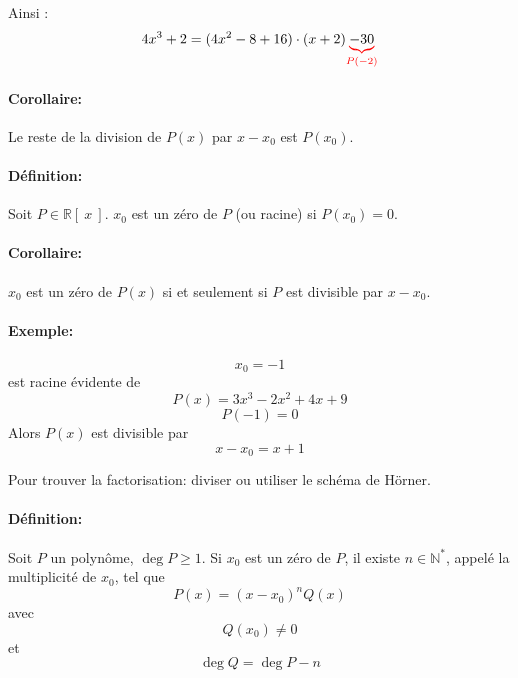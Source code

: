 \documentclass[
    11pt,
    a4paper,
    oneside,
    headinlcude, footinclude,
    twoside,
]{report}
\begin{document}
Ainsi : 
$$4x^{3} + 2 = (4x^{2} - 8 + 16) \cdot (x+2) {\color{red}\underbrace{{\color{black}-30}}_{P(-2)}}$$


\paragraph{Corollaire:}

Le reste de la division de $P(x)$ par $x-x_{0}$ est $P(x_{0})$.

\paragraph{Définition:}

Soit $P \in \mathbb{R}[\ x\ ]$. $x_{0}$ est un zéro de $P$ (ou racine) si $P(x_{0})
= 0$.

\paragraph{Corollaire:}

$x_{0}$ est un zéro de $P(x)$ si et seulement si $P$ est divisible par $x -
x_{0}$.

\paragraph{Exemple:}

$$x_{0} = -1 $$ est racine évidente de $$P(x) = 3x^{3} - 2 x^{2} +4x + 9$$
$$P(-1) = 0$$ Alors $P(x)$ est divisible par $$x - x_{0} = x + 1$$


Pour trouver la factorisation: diviser ou utiliser le schéma de Hörner.

\paragraph{Définition:}

Soit $P$ un polynôme, $\deg P \geq 1$. Si $x_{0}$ est un zéro de $P$, il existe
$n \in \mathbb{N}^{*}$, appelé la multiplicité de $x_{0}$, tel que $$P(x) =
(x-x_{0})^{n} Q(x)$$
avec $$Q(x_{0}) \neq 0$$
et $$\deg Q = \deg P -n$$
\end{document}
